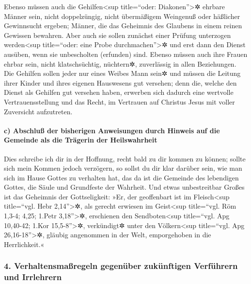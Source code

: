  Ebenso müssen auch die Gehilfen\textless sup
title=``oder: Diakonen''\textgreater✲ ehrbare Männer sein, nicht
doppelzüngig, nicht übermäßigem Weingenuß oder häßlicher Gewinnsucht
ergeben;  Männer, die das Geheimnis des Glaubens in einem
reinen Gewissen bewahren.  Aber auch sie sollen zunächst
einer Prüfung unterzogen werden\textless sup title=``oder: eine Probe
durchmachen''\textgreater✲ und erst dann den Dienst ausüben, wenn sie
unbescholten (erfunden) sind.  Ebenso müssen auch ihre
Frauen ehrbar sein, nicht klatschsüchtig, nüchtern✲, zuverlässig in
allen Beziehungen.  Die Gehilfen sollen jeder nur eines
Weibes Mann sein✲ und müssen die Leitung ihrer Kinder und ihres eigenen
Hauswesens gut versehen;  denn die, welche den Dienst als
Gehilfen gut versehen haben, erwerben sich dadurch eine wertvolle
Vertrauensstellung und das Recht, im Vertrauen auf Christus Jesus mit
voller Zuversicht aufzutreten.

\hypertarget{c-abschluuxdf-der-bisherigen-anweisungen-durch-hinweis-auf-die-gemeinde-als-die-truxe4gerin-der-heilswahrheit}{%
\paragraph{c) Abschluß der bisherigen Anweisungen durch Hinweis auf die
Gemeinde als die Trägerin der
Heilswahrheit}\label{c-abschluuxdf-der-bisherigen-anweisungen-durch-hinweis-auf-die-gemeinde-als-die-truxe4gerin-der-heilswahrheit}}

 Dies schreibe ich dir in der Hoffnung, recht bald zu dir
kommen zu können;  sollte sich mein Kommen jedoch
verzögern, so sollst du dir klar darüber sein, wie man sich im Hause
Gottes zu verhalten hat, das da ist die Gemeinde des lebendigen Gottes,
die Säule und Grundfeste der Wahrheit.  Und etwas
unbestreitbar Großes ist das Geheimnis der Gottseligkeit: »Er, der
geoffenbart ist im Fleisch\textless sup title=``vgl. Hebr
2,14''\textgreater✲, als gerecht erwiesen im Geist\textless sup
title=``vgl. Röm 1,3-4; 4,25; 1.Petr 3,18''\textgreater✲, erschienen den
Sendboten\textless sup title=``vgl. Apg 10,40-42; 1.Kor
15,5-8''\textgreater✲, verkündigt✲ unter den Völkern\textless sup
title=``vgl. Apg 26,16-18''\textgreater✲, gläubig angenommen in der
Welt, emporgehoben in die Herrlichkeit.«

\hypertarget{verhaltensmauxdfregeln-gegenuxfcber-zukuxfcnftigen-verfuxfchrern-und-irrlehrern}{%
\subsubsection{4. Verhaltensmaßregeln gegenüber zukünftigen Verführern
und
Irrlehrern}\label{verhaltensmauxdfregeln-gegenuxfcber-zukuxfcnftigen-verfuxfchrern-und-irrlehrern}}

